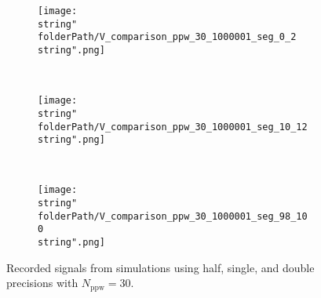 

\renewcommand{\folderPath}{\string"./fig/1D_example/validate/dt_dx/comparison/plot_dt_h_10_1p000165939331055e-04_dt_h_30_1p000165939331055e-04_dt_h_50_1p000165939331055e-04/half_naive_chop_D_dx_chop_dt_single_double\string"}


\hspace{-0.05\textwidth}
\begin{minipage}[t]{.5\textwidth}
%
\begin{figure}[H]
\captionsetup{width=0.95\textwidth,font=footnotesize,labelfont=footnotesize}
\centering
%
\begin{subfigure}[b]{1\textwidth}
%
\centering\texttt{[image: \\string"\\folderPath/V\_comparison\_ppw\_30\_1000001\_seg\_0\_2\\string".png]}
%
\end{subfigure}\hfill
\\[2ex]
%
\begin{subfigure}[b]{1\textwidth}
%
\centering\texttt{[image: \\string"\\folderPath/V\_comparison\_ppw\_30\_1000001\_seg\_10\_12\\string".png]}
%
\end{subfigure}\hfill
\\[2ex]
%
\begin{subfigure}[b]{1\textwidth}
%
\centering\texttt{[image: \\string"\\folderPath/V\_comparison\_ppw\_30\_1000001\_seg\_98\_100\\string".png]}
%
\end{subfigure}\hfill
%
\caption{Recorded signals from simulations using half, single, and double precisions with $N_\text{ppw}=30$.}
\label{comparison_V_half_naive_segments_ppw_30}
\end{figure}
%
\end{minipage}
%
\hfill %
%
